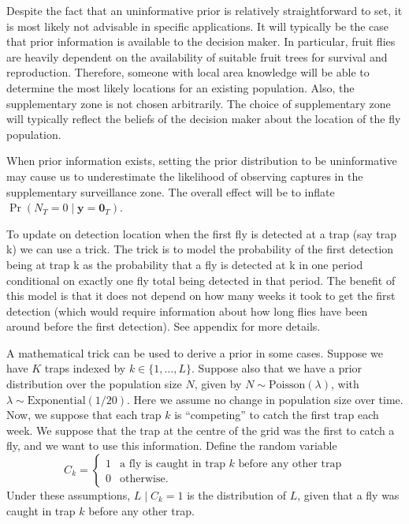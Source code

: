 \documentclass[
]{book}
\begin{document}
Despite the fact that an uninformative prior is relatively straightforward to set, it is most likely not advisable in specific applications. It will typically be the case that prior information is available to the decision maker. In particular, fruit flies are heavily dependent on the availability of suitable fruit trees for survival and reproduction. Therefore, someone with local area knowledge will be able to determine the most likely locations for an existing population. Also, the supplementary zone is not chosen arbitrarily. The choice of supplementary zone will typically reflect the beliefs of the decision maker about the location of the fly population.

When prior information exists, setting the prior distribution to be uninformative may cause us to underestimate the likelihood of observing captures in the supplementary surveillance zone. The overall effect will be to inflate \(\Pr(N_T = 0 \mid \mathbf y = \mathbf 0_T)\).

To update on detection location when the first fly is detected at a trap (say trap k) we can use a trick. The trick is to model the probability of the first detection being at trap k as the probability that a fly is detected at k in one period conditional on exactly one fly total being detected in that period. The benefit of this model is that it does not depend on how many weeks it took to get the first detection (which would require information about how long flies have been around before the first detection). See appendix for more details.

A mathematical trick can be used to derive a prior in some cases. Suppose we have \(K\) traps indexed by \(k \in \{1, \ldots, L\}\). Suppose also that we have a prior distribution over the population size \(N\), given by \(N \sim \mathrm{Poisson} (\lambda)\), with \(\lambda \sim \mathrm{Exponential(1/20)}\). Here we assume no change in population size over time. Now, we suppose that each trap \(k\) is ``competing'' to catch the first trap each week. We suppose that the trap at the centre of the grid was the first to catch a fly, and we want to use this information. Define the random variable
\[
C_k = \begin{cases}1 & \text{a fly is caught in trap } k \text{ before any other trap} \\ 0 & \text{otherwise}. \end{cases}
\]
Under these assumptions, \(L \mid C_k = 1\) is the distribution of \(L\), given that a fly was caught in trap \(k\) before any other trap.
\end{document}
